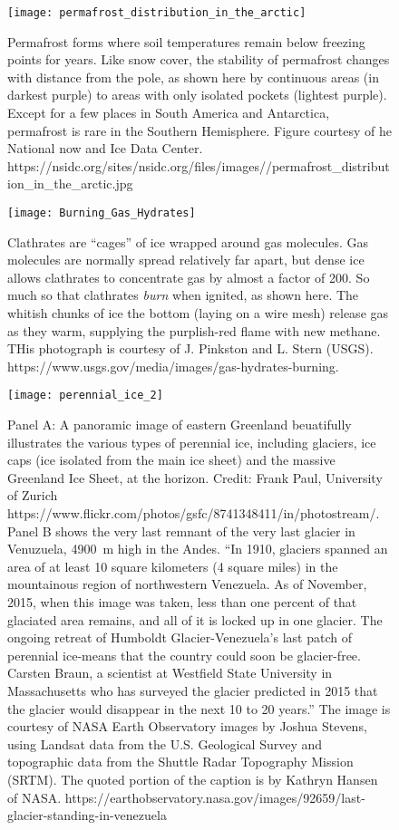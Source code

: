 \begin{figure}[p]
	\centering
  \texttt{[image: permafrost\_distribution\_in\_the\_arctic]}%
	\caption{Permafrost forms where soil temperatures remain below freezing points for years. Like snow cover, the stability of permafrost changes with distance from the pole, as shown here by continuous areas (in darkest purple) to areas with only isolated pockets (lightest purple). Except for a few places in South America and Antarctica, permafrost is rare in the Southern Hemisphere. Figure courtesy of he National now and Ice Data Center. https://nsidc.org/sites/nsidc.org/files/images//permafrost\_distribution\_in\_the\_arctic.jpg }
	\label{fig:permafrost}
\end{figure}

\begin{figure}[p]
	\centering
  \texttt{[image: Burning\_Gas\_Hydrates]}%
	\caption{Clathrates are ``cages'' of ice wrapped around gas molecules. Gas molecules are normally spread relatively far apart, but dense ice allows clathrates to concentrate gas by almost a factor of 200. So much so that clathrates \emph{burn} when ignited, as shown here. The whitish chunks of ice the bottom (laying on a wire mesh) release gas as they warm, supplying the purplish-red flame with new methane. THis photograph is courtesy of J. Pinkston and L. Stern (USGS). https://www.usgs.gov/media/images/gas-hydrates-burning.}
	\label{fig:clath_fire}
\end{figure}

\begin{figure}[p]
	\centering
  \texttt{[image: perennial\_ice\_2]}%
	\caption{Panel A: A panoramic image of eastern Greenland beuatifully illustrates the various types of perennial ice, including glaciers, ice caps (ice isolated from the main ice sheet) and the massive Greenland Ice Sheet, at the horizon. Credit: Frank Paul, University of Zurich https://www.flickr.com/photos/gsfc/8741348411/in/photostream/. Panel B shows the very last remnant of the very last glacier in Venuzuela, \SI{4900}{\metre} high in the Andes. ``In 1910, glaciers spanned an area of at least 10 square kilometers (4 square miles) in the mountainous region of northwestern Venezuela. As of November, 2015, when this image was taken, less than one percent of that glaciated area remains, and all of it is locked up in one glacier. The ongoing retreat of Humboldt Glacier-Venezuela's last patch of perennial ice-means that the country could soon be glacier-free. Carsten Braun, a scientist at Westfield State University in Massachusetts who has surveyed the glacier predicted in 2015 that the glacier would disappear in the next 10 to 20 years.'' The image is courtesy of NASA Earth Observatory images by Joshua Stevens, using Landsat data from the U.S. Geological Survey and topographic data from the Shuttle Radar Topography Mission (SRTM). The quoted portion of the caption is by Kathryn Hansen of NASA. https://earthobservatory.nasa.gov/images/92659/last-glacier-standing-in-venezuela}
	\label{fig:perennial_ice_2}
\end{figure}

